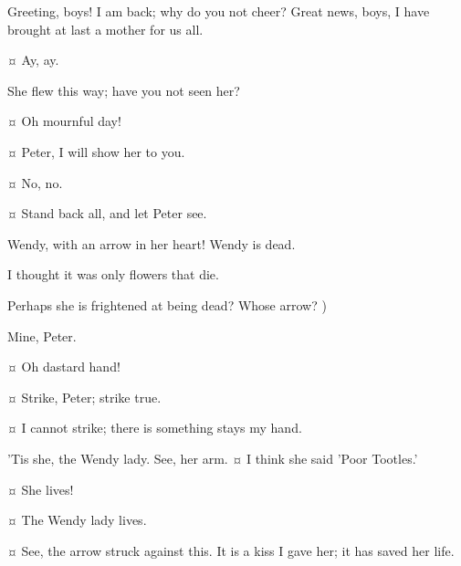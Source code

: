 \begin{drama}

\peterspeaks
Greeting, boys!
I am back; why do you not cheer?
Great news, boys, I have brought at last a mother for us all.

\slightlyspeaks {}¤
Ay, ay.

\peterspeaks
She flew this way; have you not seen her?

\secondtwinspeaks {}¤
Oh mournful day!

\tootlesspeaks {}¤
Peter, I will show her to you.

 ¤
No, no.

\tootlesspeaks {}¤
Stand back all, and let Peter see.


\peterspeaks
Wendy, with an arrow in her heart!
Wendy is dead.

\curlyspeaks
I thought it was only flowers that die.

\peterspeaks
Perhaps she is frightened at being dead?
Whose arrow?
)

\tootlesspeaks
Mine, Peter.

\peterspeaks {}¤
Oh dastard hand!

\tootlesspeaks {}¤
Strike, Peter; strike true.

\peterspeaks {}¤
I cannot strike; there is something stays my hand.


\nibsspeaks
'Tis she, the Wendy lady.
See, her arm.
¤
I think she said 'Poor Tootles.'

\peterspeaks {}¤
She lives!

\slightlyspeaks {}¤
The Wendy lady lives.

\peterspeaks {}¤
See, the arrow struck against this.
It is a kiss I gave her; it has saved her life.


\end{drama}
